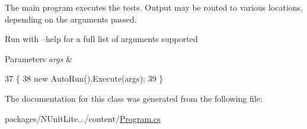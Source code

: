 The main program executes the tests. Output may be routed to various locations, depending on the arguments passed. 

Run with --help for a full list of arguments supported


\begin{DoxyParams}{Parameters}
{\em args} & \\
\hline
\end{DoxyParams}

\begin{DoxyCode}
37         \{
38             \textcolor{keyword}{new} AutoRun().Execute(args);
39         \}
\end{DoxyCode}


The documentation for this class was generated from the following file\-:\begin{DoxyCompactItemize}
\item 
packages/\-N\-Unit\-Lite.../content/\hyperlink{a00103}{Program.\-cs}\end{DoxyCompactItemize}
